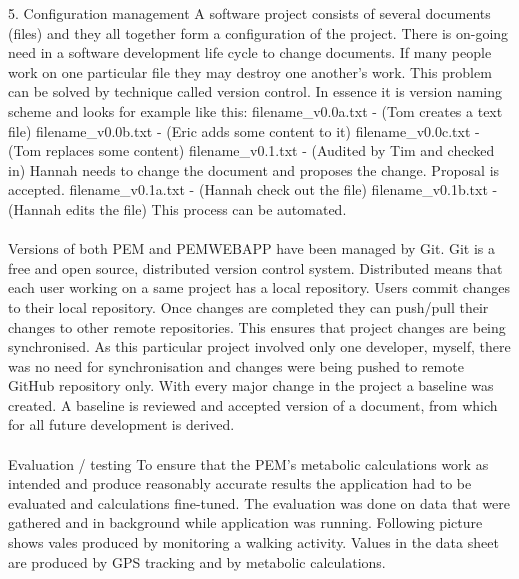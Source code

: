 \documentclass[12pt, a4paper]{report}   %
\begin{document}
\begin{enumerate}
5.	Configuration management
A software project consists of several documents (files) and they all together form a configuration of the project. There is on-going need in a software development life cycle to change documents. If many people work on one particular file they may destroy one another's work. This problem can be solved by technique called version control. In essence it is version naming scheme and looks for example like this:
filename\_v0.0a.txt  - (Tom creates a text file)
filename\_v0.0b.txt  - (Eric adds some content to it)
filename\_v0.0c.txt  - (Tom replaces some content)
filename\_v0.1.txt  - (Audited by Tim and checked in)
Hannah needs to change the document and proposes the change. Proposal is accepted.
filename\_v0.1a.txt  - (Hannah check out the file)
filename\_v0.1b.txt  - (Hannah edits the file)
This process can be automated.\\ \\
Versions of both PEM and PEMWEBAPP have been managed by Git. Git is a free and open source, distributed version control system. Distributed means that each user working on a same project has a local repository. Users commit changes to their local repository. Once changes are completed they can push/pull their changes to other remote repositories. This ensures that project changes are being synchronised. As this particular project involved only one developer, myself, there was no need for synchronisation and changes were being pushed to remote GitHub repository only.
With every major change in the project a baseline was created. A baseline is reviewed and accepted version of a document, from which for all future development is derived.\\ \\



Evaluation / testing
To ensure that the PEM's metabolic calculations work as intended and produce reasonably accurate results the application had to be evaluated and calculations fine-tuned. The evaluation was done on data that were gathered and in background while application was running. Following picture shows vales produced by monitoring a walking activity. Values in the data sheet are produced by GPS tracking and by metabolic calculations.\\ \\


\end{enumerate}
\end{document}
